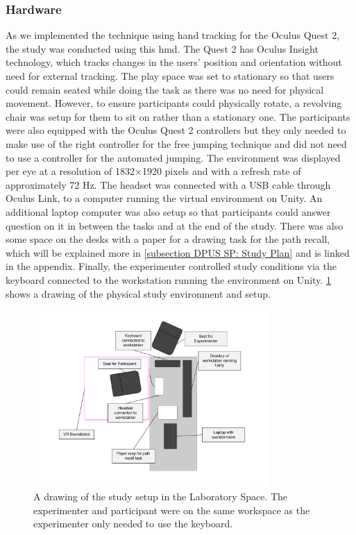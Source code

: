 \subsubsection{Hardware}
\label{subsubsection DPUS SP SS: Hardware}
As we implemented the technique using hand tracking for the Oculus Quest 2, the study was conducted using this \acrshort{hmd}. The Quest 2 has Oculus Insight technology, which tracks changes in the users' position and orientation without need for external tracking. The play space was set to stationary so that users could remain seated while doing the task as there was no need for physical movement. However, to ensure participants could physically rotate, a revolving chair was setup for them to sit on rather than a stationary one. The participants were also equipped with the Oculus Quest 2 controllers but they only needed to make use of the right controller for the free jumping technique and did not need to use a controller for the automated jumping. The environment was displayed per eye at a resolution of 1832×1920 pixels and with a refresh rate of approximately 72 Hz. The headset was connected with a USB cable through Oculus Link, to a computer running the virtual environment on Unity. An additional laptop computer was also setup so that participants could answer question on it in between the tasks and at the end of the study. There was also some space on the desks with a paper for a drawing task for the path recall, which will be explained more in \cref{subsection DPUS SP: Study Plan} and is linked in the appendix. Finally, the experimenter controlled study conditions via the keyboard connected to the workstation running the environment on Unity. \cref{fig:study-setup} shows a drawing of the physical study environment and setup.

\begin{figure}[]
	\centering 
	\includegraphics[width=0.8\textwidth]{images/study-setup.pdf}
	\caption{A drawing of the study setup in the Laboratory Space. The experimenter and participant were on the same workspace as the experimenter only needed to use the keyboard.}
	\label{fig:study-setup}
\end{figure}
 
